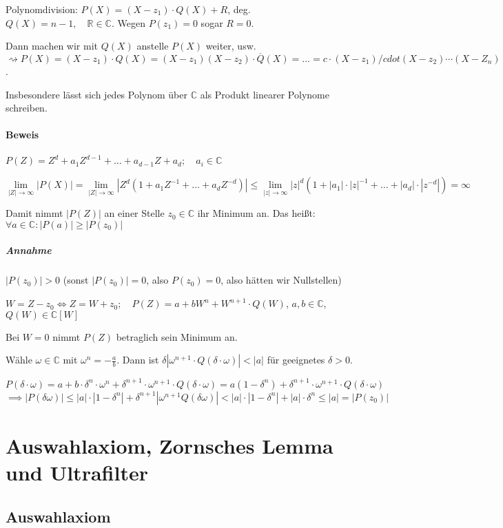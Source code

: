 \documentclass[14pt,a4paper]{article}
\newcommand{\R}{\ensuremath{\mathbb{R}}}
\newcommand{\C}{\ensuremath{\mathbb{C}}}
\begin{document}
  Polynomdivision:
  $ P(X) = (X-z_1) \cdot Q(X) + R$, deg. $Q(X) = n - 1,\quad \R \in \C$. Wegen
  $P(z_1) = 0$ sogar $R = 0$.

  
  Dann machen wir mit $Q(X)$ anstelle $P(X)$ weiter, usw.\\
  $\rightsquigarrow P(X)
  = (X - z_1) \cdot Q(X) = (X-z_1)(X-z_2)\cdot \overline{Q}(X) = \ldots = c
  \cdot (X-z_1)/cdot(X-z_2)\cdots(X-Z_n)$.

  Insbesondere lässt sich jedes Polynom über $\C$ als Produkt linearer Polynome schreiben.


  \paragraph{Beweis}
  $P(Z) = Z^d + a_1 Z^{d-1} + \ldots + a_{d-1}Z + a_d; \quad a_i \in \C$

  $$ \lim_{|Z| \to \infty} |P(X)| = \lim_{|Z| \to \infty} | Z^d (1 + a_1Z^{-1} +
  \ldots + a_d Z^{-d})| \leq \lim_{|z| \to \infty} |z|^d (1 + |a_1| \cdot
  |z|^{-1} + \ldots + |a_d|\cdot |z^{-d}|) = \infty$$

  Damit nimmt $|P(Z)|$ an einer Stelle $z_0 \in \C$ ihr Minimum an.
  Das heißt: $\forall a \in \C : |P(a)| \geq |P(z_0)|$

  \subparagraph{Annahme}
  $|P(z_0)| > 0$ (sonst $|P(z_0)| = 0$, also $P(z_0) = 0$, also hätten wir
  Nullstellen)

  $W = Z - z_0 \Leftrightarrow Z = W + z_0; \quad P(Z) = a + b W^n + W^{n+1}
  \cdot Q(W)$, $a,b \in \C$, $Q(W) \in \C [W]$

  Bei $W = 0$ nimmt $P(Z)$ betraglich sein Minimum an.

  Wähle $\omega \in \C $ mit $\omega^n = - \frac{a}{b}$.
  Dann ist $\delta|\omega^{n+1} \cdot Q(\delta \cdot \omega)| < |a|$ für
  geeignetes $\delta > 0$.

  $P(\delta \cdot \omega) = a + b \cdot \delta^n \cdot \omega^n +
  \delta^{n+1}\cdot\omega^{n+1}\cdot Q(\delta \cdot \omega) = a(1-\delta^n) +
  \delta^{n+1}\cdot\omega^{n+1}\cdot Q(\delta \cdot \omega)$\\
  $\implies |P(\delta\omega)| \leq |a| \cdot |1 - \delta^n| + \delta^{n+1}
  |\omega^{n+1} Q(\delta\omega)| < |a| \cdot |1 - \delta^n| + |a| \cdot \delta^n
  \leq |a| = |P(z_0)|$
  \section{Auswahlaxiom, Zornsches Lemma und Ultrafilter}

  \subsection{Auswahlaxiom}
\end{document}
